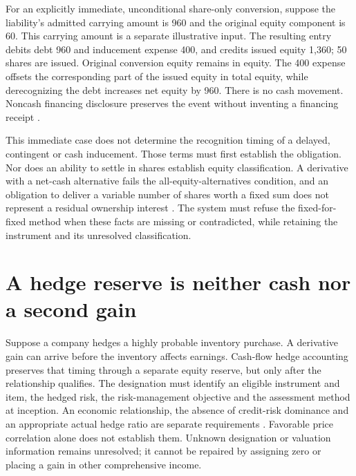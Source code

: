 For an explicitly immediate, unconditional share-only conversion, suppose the
liability's admitted carrying amount is 960 and the original equity component
is 60. This carrying amount is a separate illustrative input. The resulting
entry debits debt 960 and inducement expense 400, and credits issued equity
1,360; 50 shares are issued. Original conversion equity remains in equity.
The 400 expense offsets the corresponding part of the issued equity in total
equity, while derecognizing the debt increases net equity by 960. There is no
cash movement. Noncash financing disclosure preserves the event without
inventing a financing receipt \citep[43--44]{aasb107dated}.

This immediate case does not determine the recognition timing of a delayed,
contingent or cash inducement. Those terms must first establish the obligation.
Nor does an ability to settle in shares establish equity classification.
A derivative with a net-cash alternative fails the all-equity-alternatives
condition, and an obligation to deliver a variable number of shares worth a
fixed sum does not represent a residual ownership interest
\citep[21 and 26--27]{aasb132}. The system must refuse the fixed-for-fixed
method when these facts are missing or contradicted, while retaining the
instrument and its unresolved classification.



\section{A hedge reserve is neither cash nor a second gain}
\label{sec:hedge-lifecycle}

Suppose a company hedges a highly probable inventory purchase. A derivative
gain can arrive before the inventory affects earnings. Cash-flow hedge
accounting preserves that timing through a separate equity reserve, but only
after the relationship qualifies. The designation must identify an eligible
instrument and item, the hedged risk, the risk-management objective and the
assessment method at inception. An economic relationship, the absence of
credit-risk dominance and an appropriate actual hedge ratio are separate
requirements \citep[6.2--6.4 and B6.4.1--19]{aasb9dated}. Favorable price
correlation alone does not establish them. Unknown designation or valuation
information remains unresolved; it cannot be repaired by assigning zero or
placing a gain in other comprehensive income.

